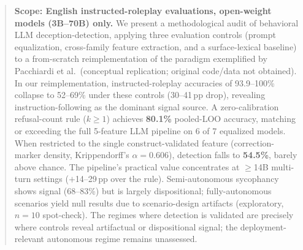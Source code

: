 \begin{abstract}
\textbf{Scope: English instructed-roleplay evaluations, open-weight models (3B--70B) only.}
We present a methodological audit of behavioral LLM deception-detection, applying three evaluation controls (prompt equalization, cross-family feature extraction, and a surface-lexical baseline) to a from-scratch reimplementation of the paradigm exemplified by Pacchiardi et al.\ (conceptual replication; original code/data not obtained). In our reimplementation, instructed-roleplay accuracies of 93.9--100\% collapse to 52--69\% under these controls (30--41\,pp drop), revealing instruction-following as the dominant signal source. A zero-calibration refusal-count rule ($k\!\geq\!1$) achieves \textbf{80.1\%} pooled-LOO accuracy, matching or exceeding the full 5-feature LLM pipeline on 6 of 7 equalized models. When restricted to the single construct-validated feature (correction-marker density, Krippendorff's $\alpha\!=\!0.606$), detection falls to \textbf{54.5\%}, barely above chance. The pipeline's practical value concentrates at $\geq$14B multi-turn settings ($+$14--29\,pp over the rule). Semi-autonomous sycophancy shows signal (68--83\%) but is largely dispositional; fully-autonomous scenarios yield null results due to scenario-design artifacts (exploratory, $n\!=\!10$ spot-check). The regimes where detection is validated are precisely where controls reveal artifactual or dispositional signal; the deployment-relevant autonomous regime remains unassessed.
\end{abstract}
